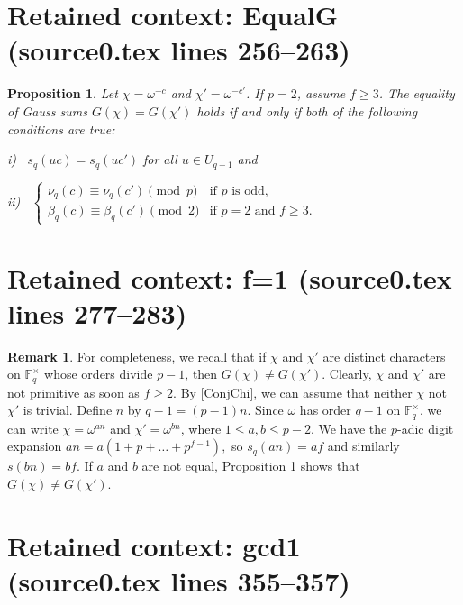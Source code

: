 \documentclass[10pt,a4paper]{amsart}
\newcommand{\F}{{\mathbb F}}
\theoremstyle{definition}
\theoremstyle{plain}
\newtheorem{prop}{Proposition}
\theoremstyle{definition}
\newtheorem{Rem}{Remark}
\begin{document}
\section*{Retained context: EqualG (source0.tex lines 256--263)}

\begin{prop}  \label{EqualG}
Let $\chi = \omega^{-c}$ and $\chi' = \omega^{-c'}$.  If $p = 2$, assume $f \ge 3$.  The equality of Gauss sums $G(\chi) = G(\chi')$ holds if and only if both of the following conditions are true:  \vspace{4 pt}  

{\rm i)} \, $s_q(uc) = s_q(uc')$ for all $u \in U_{q-1}$ \vspace{5 pt} and \hspace{10 pt} 

{\rm ii)} \, $\begin{cases} \nu_q(c)  \equiv \nu_q(c') \pmod{p} &\text{if } p \text{ is odd}, \\[2 pt]
           \beta_q(c)  \equiv \beta_q(c')  \pmod{2} &\text{if } p = 2 \text{ and } f \ge 3. \end{cases}$ 
\end{prop}


\section*{Retained context: f=1 (source0.tex lines 277--283)}

\begin{Rem} \label{f=1}
For completeness, we recall that if $\chi$ and $\chi'$ are distinct characters on $\F_q^\times$ whose orders divide $p-1$, then $G(\chi) \ne G(\chi')$.  Clearly, $\chi$ and $\chi'$ are not primitive as soon as $f \ge 2$.   By \eqref{ConjChi}, we can assume that neither $\chi$ not $\chi'$ is trivial.  Define $n$ by $q-1 = (p-1)n$.  Since $\omega$ has order $q-1$ on $\F_q^\times$, we can write $\chi = \omega^{an}$ and $\chi' = \omega^{bn}$, where $1 \le a,b \le p-2$.  We have the $p$-adic digit expansion
$
an = a(1+p+\dots+ p^{f-1}), 
$
so $s_q(an) = af$ and similarly $s(bn) = bf$.  If $a$ and $b$ are not equal, Proposition \ref{EqualG} shows that $G(\chi) \ne G(\chi')$.
\end{Rem}


\section*{Retained context: gcd1 (source0.tex lines 355--357)}
\end{document}
